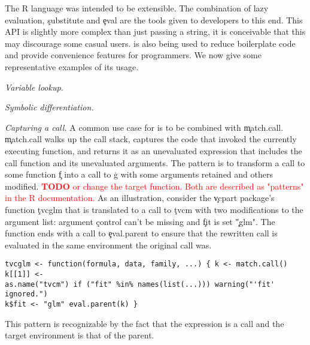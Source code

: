 \documentclass[screen,acmsmall]{acmart}
\newcommand{\mypara}[1]{\medskip\noindent\emph{#1}\xspace}
\newcommand{\authorcomment}[3]{\xspace\textcolor{#1}{{\bf #2} #3}\xspace}
\newcommand{\todo}[1]{\authorcomment{red}{TODO}{#1}}
\begin{document}



The R language was intended to be extensible. The combination of lazy
evaluation, \c{substitute} and \c{eval} are the tools given to
developers to this end. This API is slightly more complex than just
passing a string, it is conceivable that this may discourage some
casual users. \Eval is also being used to reduce boilerplate code and
provide convenience features for programmers. We now give some
representative examples of its usage.

\mypara{Variable lookup.} %

\mypara{Symbolic differentiation.} %

\mypara{Capturing a call.}  A common use case for \eval is to be combined with \c{match.call}.
\c{match.call} walks up the call stack, captures the code that invoked the
currently executing function, and returns it as an unevaluated expression that includes the call function and its unevaluated arguments. The
pattern is to transform a call to some function \c{f} into a call to \c{g} with
some arguments retained and others modified.  \todo{or change the target
function. Both are described as "patterns" in the R documentation.} As an
illustration, consider the \c{vcpart} package's function \c{tvcglm} that is
translated to a call to \c{tvcm} with two modifications to the argument list:
argument \c{control} can't be missing and \c{fit} is set \c{"glm"}. The
function ends with a call to \c{eval.parent} to ensure that the rewritten call
is evaluated in the same environment the original call was.  \begin{lstlisting}
tvcglm <- function(formula, data, family, ...) { k <- match.call() k[[1]] <-
as.name("tvcm") if ("fit" %in% names(list(...))) warning("'fit' ignored.")
k$fit <- "glm" eval.parent(k) } \end{lstlisting} This pattern is recognizable
by the fact that the expression is a call and the target environment is that of
the parent.
\end{document}

